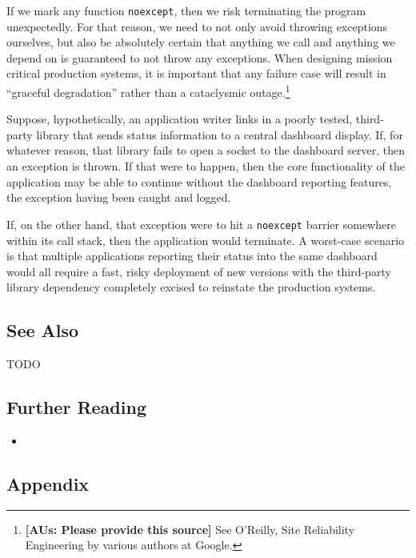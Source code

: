 If we mark any function \lstinline!noexcept!, then we risk terminating the
program unexpectedly. For that reason, we need to not only avoid
throwing exceptions ourselves, but also be absolutely certain that
anything we call and anything we depend on is guaranteed to not throw
any exceptions. When designing mission critical production systems, it
is important that any failure case will result in ``graceful
degradation'' rather than a cataclysmic outage.{\cprotect\footnote{\textbf{[AUs: Please provide this source]} See
  O'Reilly, Site Reliability Engineering by various authors at Google.}}

Suppose, hypothetically, an application writer links in a poorly tested,
third-party library that sends status information to a central dashboard
display. If, for whatever reason, that library fails to open a socket to
the dashboard server, then an exception is thrown. If that were to
happen, then the core functionality of the application may be able to
continue without the dashboard reporting features, the exception having
been caught and logged.

If, on the other hand, that exception were to hit a \lstinline!noexcept!
barrier somewhere within its call stack, then the application would
terminate. A worst-case scenario is that multiple applications reporting
their status into the same dashboard would all require a fast, risky
deployment of new versions with the third-party library dependency
completely excised to reinstate the production systems.

\subsection[See Also]{See Also}\label{see-also}

TODO

\subsection[Further Reading]{Further Reading}\label{further-reading}

\begin{itemize}
\item{\cite{krzemienski11}}
\end{itemize}

\subsection[Appendix]{Appendix}\label{appendix-noexceptoperator}

